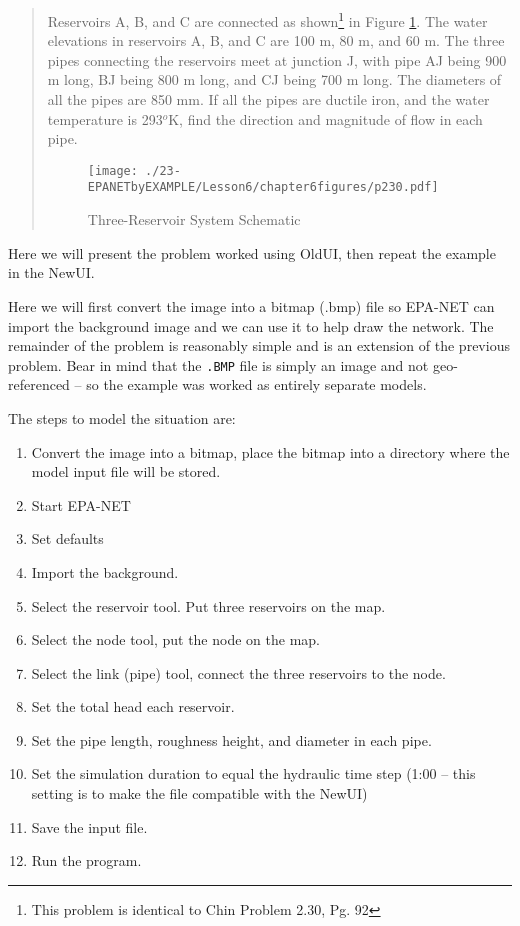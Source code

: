 \begin{quote}
Reservoirs A, B, and C are connected as shown\footnote{This problem is identical to Chin Problem 2.30, Pg. 92} in Figure \ref{fig:p230}.  The water elevations in reservoirs A, B, and C are 100 m, 80 m, and 60 m.   The three pipes connecting the reservoirs meet at junction J, with pipe AJ being 900 m long, BJ being 800 m long, and CJ being 700 m long.  The diameters of all the pipes are
850 mm.  If all the pipes are ductile iron, and the water temperature is 293$^o$K, find the direction and magnitude of flow in each pipe.

\begin{figure}[htbp] %
   \centering
   \texttt{[image: ./23-EPANETbyEXAMPLE/Lesson6/chapter6figures/p230.pdf]} 
   \caption{Three-Reservoir System Schematic}
   \label{fig:p230}
\end{figure}
\end{quote}

Here we will present the problem worked using OldUI, then repeat the example in the NewUI.

Here we will first convert the image into a bitmap (.bmp) file so EPA-NET can import the background image and we can use it to help draw the network.  The remainder of the problem is reasonably simple and is an extension of the previous problem.
Bear in mind that the \texttt{.BMP} file is simply an image and not geo-referenced -- so the example was worked as entirely separate models.

The steps to model the situation are:
\begin{enumerate}
\item Convert the image into a bitmap, place the bitmap into a directory where the model input file will be stored.
\item Start EPA-NET
\item Set defaults
\item Import the background.
\item Select the reservoir tool.  Put three reservoirs on the map.
\item Select the node tool, put the node on the map.
\item Select the link (pipe) tool, connect the three reservoirs to the node.  
\item Set the total head each reservoir.
\item Set the pipe length, roughness height, and diameter in each pipe.
\item Set the simulation duration to equal the hydraulic time step (1:00 -- this setting is to make the file compatible with the NewUI)
\item Save the input file.
\item Run the program.   
\end{enumerate}

